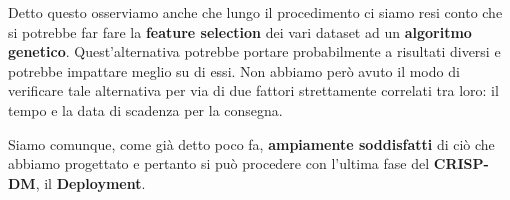 \documentclass[a4paper, 11pt, oneside]{report}
\begin{document}
            \par \noindent Detto questo osserviamo anche che lungo il procedimento ci siamo resi conto che si potrebbe far
            fare la \textbf{feature selection} dei vari dataset ad un \textbf{algoritmo genetico}.
            Quest'alternativa potrebbe portare probabilmente a risultati diversi e potrebbe impattare meglio su di essi.
            Non abbiamo però avuto il modo di verificare tale alternativa per via di due fattori strettamente
            correlati tra loro: il tempo e la data di scadenza per la consegna.
            \par \noindent
            \par \noindent Siamo comunque, come già detto poco fa, \textbf{ampiamente soddisfatti} di ciò che abbiamo progettato
            e pertanto si può procedere con l'ultima fase del \textbf{CRISP-DM}, il \textbf{Deployment}.
            \newpage
\end{document}
